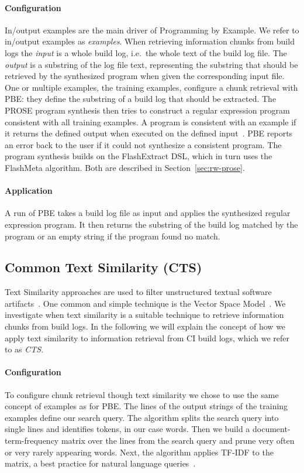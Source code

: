 \documentclass[\myrootdir/main.tex]{subfiles}
\begin{document}
\paragraph{Configuration}
In/output examples are the main driver of Programming by Example.
We refer to in/output examples as \emph{examples}.
When retrieving information chunks from build logs the \emph{input} is a whole build log, i.e.\ the whole text of the build log file.
The \emph{output} is a substring of the log file text, representing the substring that should be retrieved by the synthesized program when given the corresponding input file.
One or multiple examples, the training examples, configure a chunk retrieval with PBE: they define the substring of a build log that should be extracted.
The PROSE program synthesis then tries to construct a regular expression program consistent with all training examples.
A program is consistent with an example if it returns the defined output when executed on the defined input~\cite{mitchell1982generalization}.
PBE reports an error back to the user if it could not synthesize a consistent program.
The program synthesis builds on the FlashExtract DSL, which in turn uses the FlashMeta algorithm.
Both are described in Section~\ref{sec:rw-prose}.

\paragraph{Application}
A run of PBE takes a build log file as input and applies the synthesized regular expression program.
It then returns the substring of the build log matched by the program or an empty string if the program found no match.

\subsection{Common Text Similarity (CTS)}
\label{sec:expl-ts}
Text Similarity approaches are used to filter unstructured textual software artifacts~\cite{runeson2007detection,marcus2005recovery,antoniol2002recovering,mccarey2006recommending}.
One common and simple technique is the Vector Space Model~\cite{schutze2008introduction}.
We investigate when text similarity is a suitable technique to retrieve information chunks from build logs.
In the following we will explain the concept of how we apply text similarity to information retrieval from CI build logs, which we refer to as \emph{CTS}\@.

\paragraph{Configuration}
To configure chunk retrieval though text similarity we chose to use the same concept of examples as for PBE\@.
The lines of the output strings of the training examples define our search query.
The algorithm splits the search query into single lines and identifies tokens, in our case words.
Then we build a document-term-frequency matrix over the lines from the search query and prune very often or very rarely appearing words.
Next, the algorithm applies TF-IDF to the matrix, a best practice for natural language queries~\cite{lee1997document}.
\end{document}
